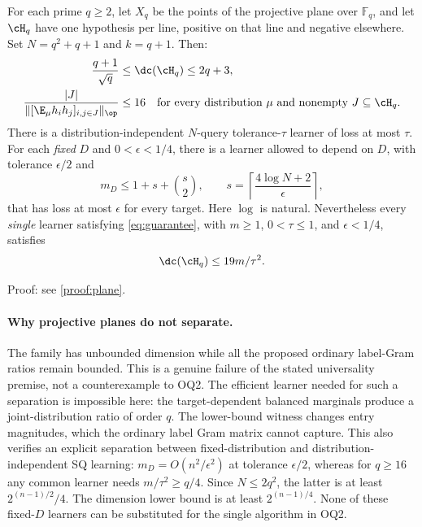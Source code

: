 \begin{theorem}\label{thm:plane}
For each prime $q\geq2$, let $X_q$ be the points of the projective plane over $\mathbb F_q$, and let $\cH_q$ have one hypothesis per line, positive on that line and negative elsewhere. Set $N=q^2+q+1$ and $k=q+1$. Then:
\begin{align}
 \frac{q+1}{\sqrt q}&\leq\dc(\cH_q)\leq2q+3,\label{eq:planedc}\\
 \frac{|J|}{\|[\E_\mu h_i h_j]_{i,j\in J}\|_\op}&\leq16
 \quad\text{for every distribution $\mu$ and nonempty $J\subseteq\cH_q$}.
 \label{eq:planeplain}
\end{align}
There is a distribution-independent $N$-query tolerance-$\tau$ learner of loss at most $\tau$. For each \emph{fixed} $D$ and $0<\epsilon<1/4$, there is a learner allowed to depend on $D$, with tolerance $\epsilon/2$ and
\[
 m_D\leq1+s+\binom{s}{2},\qquad
 s=\left\lceil\frac{4\log N+2}{\epsilon}\right\rceil,
\]
that has loss at most $\epsilon$ for every target. Here $\log$ is natural.
Nevertheless every \emph{single} learner satisfying \eqref{eq:guarantee}, with $m\geq1$, $0<\tau\leq1$, and $\epsilon<1/4$, satisfies
\begin{equation}\label{eq:plane19}
 \dc(\cH_q)\leq19m/\tau^2.
\end{equation}
\end{theorem}

\noindent Proof: see \cref{proof:plane}.\par


\paragraph{Why projective planes do not separate.}
The family has unbounded dimension while all the proposed ordinary label-Gram ratios remain bounded. This is a genuine failure of the stated universality premise, not a counterexample to OQ2. The efficient learner needed for such a separation is impossible here: the target-dependent balanced marginals produce a joint-distribution ratio of order $q$. The lower-bound witness changes entry magnitudes, which the ordinary label Gram matrix cannot capture. This also verifies an explicit separation between fixed-distribution and distribution-independent SQ learning: $m_D=O(n^2/\epsilon^2)$ at tolerance $\epsilon/2$, whereas for $q\geq16$ any common learner needs $m/\tau^2\geq q/4$. Since $N\leq2q^2$, the latter is at least $2^{(n-1)/2}/4$. The dimension lower bound is at least $2^{(n-1)/4}$. None of these fixed-$D$ learners can be substituted for the single algorithm in OQ2.

